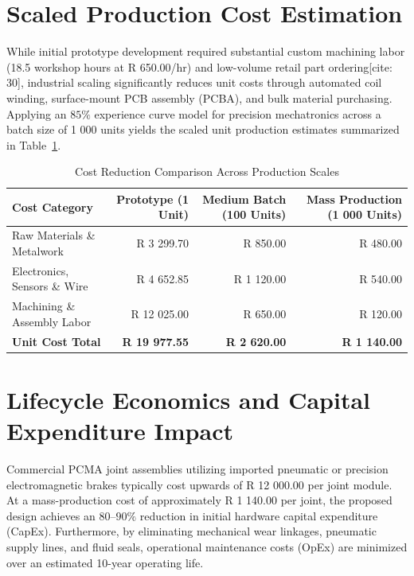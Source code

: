 \section{Scaled Production Cost Estimation}
While initial prototype development required substantial custom machining labor (18.5 workshop hours at R 650.00/hr) and low-volume retail part ordering[cite: 30], industrial scaling significantly reduces unit costs through automated coil winding, surface-mount PCB assembly (PCBA), and bulk material purchasing. Applying an $85\%$ experience curve model for precision mechatronics across a batch size of 1 000 units yields the scaled unit production estimates summarized in Table~\ref{tab:scaled_costs}.

\begin{table}[H]
	\centering
	\caption{Cost Reduction Comparison Across Production Scales}
	\label{tab:scaled_costs}
	\small
	\begin{tabular}{lrrr}
		\toprule
		\textbf{Cost Category} & \textbf{Prototype (1 Unit)} & \textbf{Medium Batch (100 Units)} & \textbf{Mass Production (1 000 Units)} \\
		\midrule
		Raw Materials \& Metalwork  & R 3 299.70 & R 850.00 & R 480.00 \\
		Electronics, Sensors \& Wire & R 4 652.85 & R 1 120.00 & R 540.00 \\
		Machining \& Assembly Labor  & R 12 025.00 & R 650.00 & R 120.00 \\
		\midrule
		\textbf{Unit Cost Total}     & \textbf{R 19 977.55} & \textbf{R 2 620.00} & \textbf{R 1 140.00} \\
		\bottomrule
	\end{tabular}
\end{table}

\section{Lifecycle Economics and Capital Expenditure Impact}
Commercial PCMA joint assemblies utilizing imported pneumatic or precision electromagnetic brakes typically cost upwards of R 12 000.00 per joint module. At a mass-production cost of approximately R 1 140.00 per joint, the proposed design achieves an $80\text{--}90\%$ reduction in initial hardware capital expenditure (CapEx). Furthermore, by eliminating mechanical wear linkages, pneumatic supply lines, and fluid seals, operational maintenance costs (OpEx) are minimized over an estimated 10-year operating life.